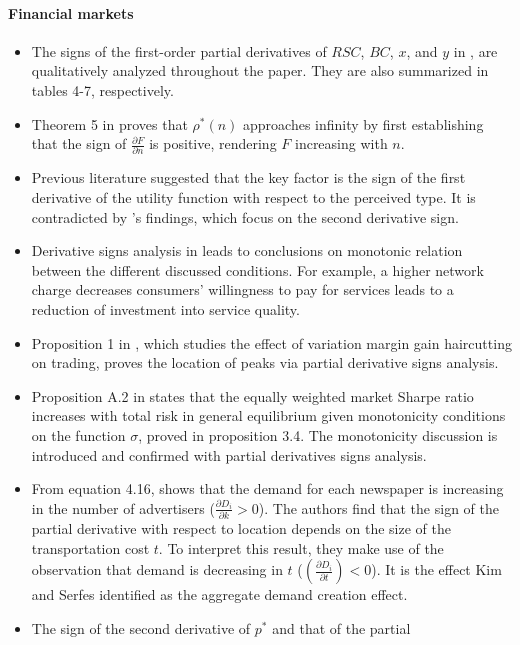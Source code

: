 \documentclass[11pt]{book}
\begin{document}
\paragraph{Financial markets}
\begin{itemize}
\item The signs of the first-order partial derivatives of $RSC$, $BC$,
$x$, and $y$ in \cite{ricke2004link},
are qualitatively analyzed throughout the paper. They are also summarized
in tables 4-7, respectively.
\item Theorem 5 in \cite{madden2006geographical}
proves that $\rho^{*}\left(n\right)$ approaches infinity by first
establishing that the sign of $\frac{\partial F}{\partial n}$ is
positive, rendering $F$ increasing with $n$.
\item Previous literature suggested that the key factor is the sign of the
first derivative of the utility function with respect to the perceived
type. It is contradicted by \cite{molnar2008revenue}'s
findings, which focus on the second derivative sign.
\item Derivative signs analysis in \cite{haucap2012regulation}
leads to conclusions on monotonic relation between the different discussed
conditions. For example, a higher network charge decreases consumers'
willingness to pay for services leads to a reduction of investment
into service quality.
\item Proposition 1 in \cite{raykov2016share},
which studies the effect of variation margin gain haircutting on trading,
proves the location of peaks via partial derivative signs analysis.
\item Proposition A.2 in \cite{eisfeldt2017complex} states that
the equally weighted market Sharpe ratio increases with total risk
in general equilibrium given monotonicity conditions on the function
$\sigma$, proved in proposition 3.4. The monotonicity discussion
is introduced and confirmed with partial derivatives signs analysis.
\item From equation 4.16, \cite{hansen2017newspapers}
shows that the demand for each newspaper is increasing in the number
of advertisers ($\frac{\partial D_{i}}{\partial k}>0$). The authors
find that the sign of the partial derivative with respect to location
depends on the size of the transportation cost $t$. To interpret
this result, they make use of the observation that demand is decreasing
in $t$ ($\left(\frac{\partial D_{i}}{\partial t}\right)<0$). It
is the effect Kim and Serfes identified as the aggregate demand creation
effect.
\item The sign of the second derivative of $p^{*}$ and that of the partial

\end{itemize}
\end{document}
